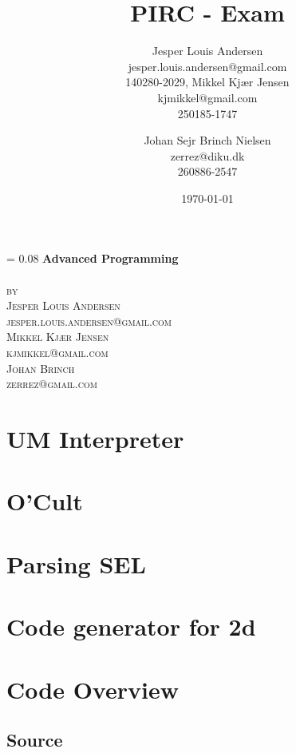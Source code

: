 \documentclass[a4paper, oneside, 10pt, draft]{memoir}
\author{Jesper Louis
  Andersen\\jesper.louis.andersen@gmail.com\\140280-2029,
  Mikkel Kj\ae r Jensen \\ kjmikkel@gmail.com\\250185-1747 \and
  Johan Sejr Brinch Nielsen \\ zerrez@diku.dk \\ 260886-2547
}
\title{PIRC - Exam}
\date{\today}
\makeatletter
\renewcommand*{\titleM}{\begingroup%
  \drop = 0.08\textheight
  \centering
  {\Huge\bfseries Advanced Programming}\\[\baselineskip]
  {\scshape}\\[\baselineskip]
  {\scshape by}\\[\baselineskip]
  {\large\scshape Jesper Louis Andersen\\jesper.louis.andersen@gmail.com}\\[\baselineskip]
  {\large\scshape Mikkel Kj\ae r Jensen\\kjmikkel@gmail.com}\\[\baselineskip]
  {\large\scshape Johan Brinch\\zerrez@gmail.com}\\[\baselineskip]
  \endgroup}
\makeatother
\begin{document}
\titleM
\listoffixmes
\tableofcontents

\chapter{UM Interpreter}
\label{chap:task+1}

\chapter{O'Cult}
\label{chap:ocult}

\chapter{Parsing SEL}


\chapter{Code generator for 2d}
\label{compiler}








\appendix
\clearpage
\chapter{Code Overview}

\section{Source}
\end{document}
